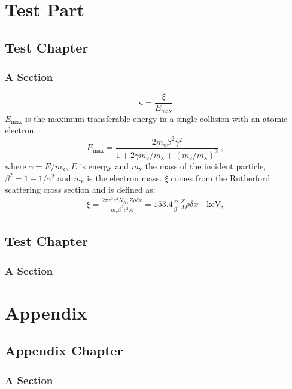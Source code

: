 \documentclass[11pt,a5paper,footinclude,headinclude]{scrbook} %
\begin{document}

    \tableofcontents


    \cleardoublepage\part{Test Part}
    \chapter{Test Chapter}
    \lipsum[1]

    \section{A Section}
    \begin{equation}
    	\kappa =\frac{\xi}{E_{\textrm{max}}} %
    \end{equation}
    $E_{\textrm{max}}$ is the maximum transferable energy in a single
    collision with an atomic electron.
    \[
    E_{\textrm{max}} =\frac{2 m_{\textrm{e}} \beta^2\gamma^2 }{1 +
    	2\gamma m_{\textrm{e}}/m_{\textrm{x}} + \left ( m_{\textrm{e}}
    	/m_{\textrm{x}}\right)^2}\ ,
    \]
    where $\gamma = E/m_{\textrm{x}}$, $E$ is energy and
    $m_{\textrm{x}}$ the mass of the incident particle,
    $\beta^2 = 1 - 1/\gamma^2$ and $m_{\textrm{e}}$ is the electron mass.
    $\xi$ comes from the Rutherford scattering cross section
    and is defined as:
    \begin{eqnarray*} \xi  = \frac{2\pi z^2 e^4 N_{\textrm{Av}} Z \rho
    		\delta x}{m_{\textrm{e}} \beta^2 c^2 A} =  153.4 \frac{z^2}{\beta^2}
    	\frac{Z}{A}
    	\rho \delta x \quad\textrm{keV},
    \end{eqnarray*}

    \chapter{Test Chapter}
    \lipsum[1]

    \section{A Section}
    \lipsum[1]

%   

    \appendix
    \cleardoublepage\part{Appendix}
    \chapter{Appendix Chapter}
    \lipsum[1]

    \section{A Section}
    \lipsum[1]
\end{document}
